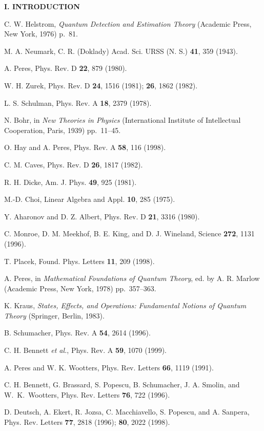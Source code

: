 \begin{center}{\bf I. INTRODUCTION}
\begin{thebibliography}{99}
 C. W. Helstrom, {\it Quantum Detection and Estimation
Theory\/} (Academic Press, New York, 1976) p.~81.

 M. A. Neumark, C. R. (Doklady) Acad. Sci. URSS (N. S.)
{\bf41}, 359 (1943).

 A. Peres, Phys. Rev. D {\bf22}, 879 (1980).

 W. H. Zurek, Phys. Rev. D {\bf24}, 1516 (1981);
{\bf26}, 1862 (1982).

 L. S. Schulman, Phys. Rev. A {\bf18}, 2379 (1978).

 N. Bohr, in {\it New Theories in Physics\/}
(International Institute of Intellectual Cooperation, Paris, 1939)
pp.~11--45.

 O. Hay and A. Peres, Phys. Rev. A {\bf 58}, 116 (1998).

 C. M. Caves, Phys. Rev. D {\bf 26}, 1817 (1982).

 R. H. Dicke, Am. J. Phys. {\bf49}, 925 (1981).

 M.-D. Choi, Linear Algebra and Appl. {\bf10}, 285 (1975).

 Y. Aharonov and D. Z. Albert, Phys. Rev. D {\bf21}, 3316
(1980).

 C. Monroe, D. M. Meekhof, B. E. King, and D. J.
Wineland, Science {\bf272}, 1131 (1996).

 T. Placek, Found. Phys. Letters {\bf11}, 209 (1998).

 A. Peres, in {\it Mathematical Foundations of Quantum
Theory\/}, ed. by A. R. Marlow (Academic Press, New York, 1978)
pp.~357--363.

 K. Kraus, {\it States, Effects, and Operations:
Fundamental Notions of Quantum Theory\/} (Springer, Berlin, 1983).

 B. Schumacher, Phys. Rev. A {\bf54}, 2614 (1996).

 C. H. Bennett {\it et al.\/},  Phys. Rev. A {\bf 59}, 1070
(1999).

 A. Peres and W. K. Wootters, Phys. Rev. Letters {\bf66},
1119 (1991).

 C. H. Bennett, G. Brassard, S. Popescu, B. Schumacher,
J. A. Smolin, and W.~K.~Wootters, Phys. Rev. Letters {\bf76}, 722
(1996).

 D. Deutsch, A. Ekert, R. Jozsa, C. Macchiavello, S.
Popescu, and A. Sanpera, Phys. Rev. Letters {\bf77}, 2818 (1996);
{\bf80}, 2022 (1998).


\end{thebibliography}
\end{center}
